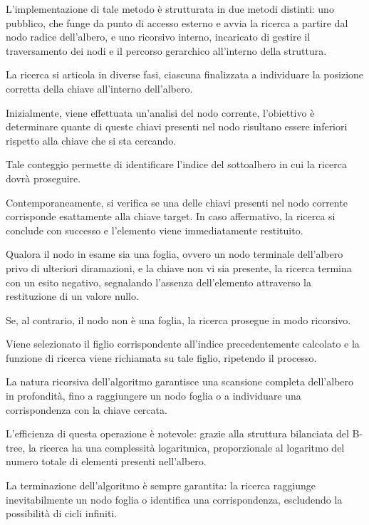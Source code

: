 \documentclass[12pt,a4paper,openright,twoside]{book}
\begin{document}
                    L'implementazione di tale metodo è strutturata in due metodi distinti: uno pubblico, che funge da punto di accesso esterno e avvia la ricerca a partire dal nodo radice dell'albero, e uno ricorsivo interno, incaricato di gestire il traversamento dei nodi e il percorso gerarchico all'interno della struttura.

                    La ricerca si articola in diverse fasi, ciascuna finalizzata a individuare la posizione corretta della chiave all'interno dell'albero.

                    Inizialmente, viene effettuata un'analisi del nodo corrente, l'obiettivo è determinare quante di queste chiavi presenti nel nodo risultano essere inferiori rispetto alla chiave che si sta cercando.

                    Tale conteggio permette di identificare l'indice del sottoalbero in cui la ricerca dovrà proseguire.

                    Contemporaneamente, si verifica se una delle chiavi presenti nel nodo corrente corrisponde esattamente alla chiave target. In caso affermativo, la ricerca si conclude con successo e l'elemento viene immediatamente restituito.

                    Qualora il nodo in esame sia una foglia, ovvero un nodo terminale dell'albero privo di ulteriori diramazioni, e la chiave non vi sia presente, la ricerca termina con un esito negativo, segnalando l'assenza dell'elemento attraverso la restituzione di un valore nullo.

                    Se, al contrario, il nodo non è una foglia, la ricerca prosegue in modo ricorsivo.

                    Viene selezionato il figlio corrispondente all'indice precedentemente calcolato e la funzione di ricerca viene richiamata su tale figlio, ripetendo il processo.

                    La natura ricorsiva dell'algoritmo garantisce una scansione completa dell'albero in profondità, fino a raggiungere un nodo foglia o a individuare una corrispondenza con la chiave cercata.

                    L'efficienza di questa operazione è notevole: grazie alla struttura bilanciata del B-tree, la ricerca ha una complessità logaritmica, proporzionale al logaritmo del numero totale di elementi presenti nell'albero.

                    \pagebreak

                    La terminazione dell'algoritmo è sempre garantita: la ricerca raggiunge inevitabilmente un nodo foglia o identifica una corrispondenza, escludendo la possibilità di cicli infiniti.
\end{document}
